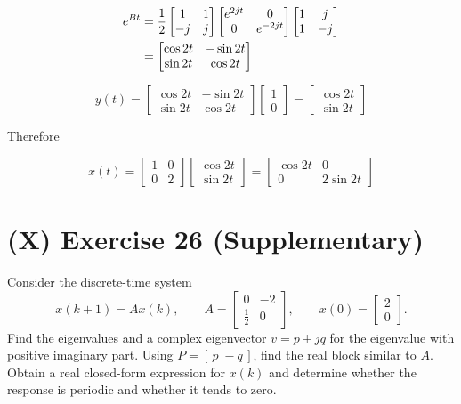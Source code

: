 \documentclass[12pt,a4paper]{article}
\begin{document}
\begin{align*}
	e^{Bt} &= {1\over2}\begin{bmatrix}
		1 & 1 \\
		-j & j
	\end{bmatrix}\begin{bmatrix}
	e^{2jt} & 0 \\
	0 & e^{-2jt}
	\end{bmatrix} \begin{bmatrix}
	1 & j \\ 1 & -j
	\end{bmatrix} \\
	&= \begin{bmatrix}
		\cos 2t & -\sin 2t \\
		\sin 2t & \cos 2t
	\end{bmatrix}
\end{align*}

\[
y(t) = \begin{bmatrix}
	\cos 2t & -\sin 2t \\
	\sin 2t & \cos 2t
\end{bmatrix}\begin{bmatrix}
1 \\ 0
\end{bmatrix} = \begin{bmatrix}
\cos 2t \\ \sin 2t
\end{bmatrix}
\]

Therefore 

\[
x(t) = \begin{bmatrix}
	1 & 0 \\ 0 & 2
\end{bmatrix}\begin{bmatrix}
\cos 2t \\ \sin 2t
\end{bmatrix} = \begin{bmatrix}
\cos 2t & 0 \\ 0 & 2\sin2t
\end{bmatrix}
\]

\vspace{4cm}
\clearpage
\section*{(X) Exercise 26 \hfill {\normalsize (Supplementary)}}
Consider the discrete-time system
\[
x(k+1)=Ax(k),\qquad
A=\begin{bmatrix}0&-2\\[2pt]\tfrac12&0\end{bmatrix},\qquad
x(0)=\begin{bmatrix}2\\0\end{bmatrix}.
\]
Find the eigenvalues and a complex eigenvector $v=p+jq$ for the eigenvalue
with positive imaginary part. Using $P=[\,p\; -q\,]$, find the real block
similar to $A$. Obtain a real closed-form expression for $x(k)$ and determine
whether the response is periodic and whether it tends to zero.
\end{document}
